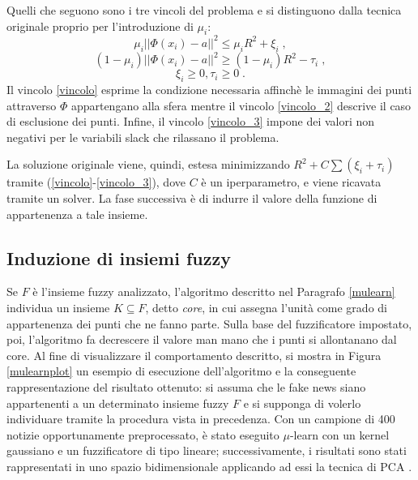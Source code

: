 \documentclass[12pt]{report}
\theoremstyle{definition}
\begin{document}
Quelli che seguono sono i tre vincoli del problema e si distinguono dalla tecnica originale proprio per l'introduzione di $\mu_i$:
\begin{equation}\label{vincolo}
    \mu_i || \mathit{\Phi}(x_i) - a ||^2 \leq \mu_iR^2 + \xi_i \;,
\end{equation}
\begin{equation}\label{vincolo_2}
    (1 - \mu_i) || \mathit{\Phi}(x_i) - a ||^2 \geq (1 - \mu_i)R^2 - \tau_i \;,
\end{equation}
\begin{equation}\label{vincolo_3}
    \xi_i \geq 0, \tau_i \geq 0 \;.
\end{equation}
Il vincolo \ref{vincolo} esprime la condizione necessaria affinchè le immagini dei punti attraverso $\mathit{\Phi}$ appartengano alla sfera mentre il vincolo \ref{vincolo_2} descrive il caso di esclusione dei punti. Infine, il vincolo \ref{vincolo_3} impone dei valori non negativi per le variabili slack che rilassano il problema.

La soluzione originale viene, quindi, estesa minimizzando $R^2 + C\sum(\xi_i + \tau_i)$ tramite (\ref{vincolo}-\ref{vincolo_3}), dove $C$ è un iperparametro, e viene ricavata tramite un solver.
La fase successiva è di indurre il valore della funzione di appartenenza a tale insieme.

\subsection{Induzione di insiemi fuzzy}
Se $F$ è l'insieme fuzzy analizzato, l'algoritmo descritto nel Paragrafo \ref{mulearn} individua un insieme $K \subseteq F$, detto \textit{core}, in cui assegna l'unità come grado di appartenenza dei punti che ne fanno parte. Sulla base del fuzzificatore impostato, poi, l'algoritmo fa decrescere il valore man mano che i punti si allontanano dal core. 
Al fine di visualizzare il comportamento descritto, si mostra in Figura \ref{mulearnplot} un esempio di esecuzione dell'algoritmo e la conseguente rappresentazione del risultato ottenuto:
si assuma che le fake news siano appartenenti a un determinato insieme fuzzy $F$ e si supponga di volerlo individuare tramite la procedura vista in precedenza.
Con un campione di 400 notizie opportunamente preprocessato, è stato eseguito $\mu$-learn con un kernel gaussiano e un fuzzificatore di tipo lineare; successivamente, i risultati sono stati rappresentati in uno spazio bidimensionale applicando ad essi la tecnica di PCA \cite{30}.
\end{document}
